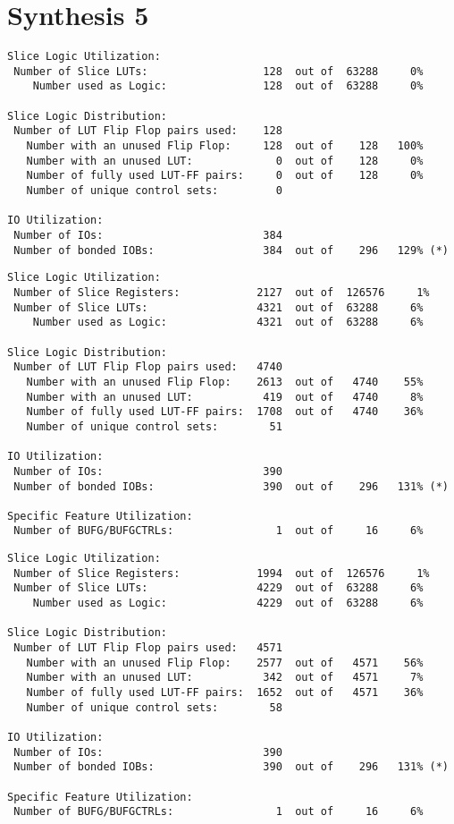 \section*{Synthesis 5}
\begin{verbatim}
Slice Logic Utilization: 
 Number of Slice LUTs:                  128  out of  63288     0%  
    Number used as Logic:               128  out of  63288     0%  

Slice Logic Distribution: 
 Number of LUT Flip Flop pairs used:    128
   Number with an unused Flip Flop:     128  out of    128   100%  
   Number with an unused LUT:             0  out of    128     0%  
   Number of fully used LUT-FF pairs:     0  out of    128     0%  
   Number of unique control sets:         0

IO Utilization: 
 Number of IOs:                         384
 Number of bonded IOBs:                 384  out of    296   129% (*) 
\end{verbatim}

\begin{verbatim}
Slice Logic Utilization: 
 Number of Slice Registers:            2127  out of  126576     1%  
 Number of Slice LUTs:                 4321  out of  63288     6%  
    Number used as Logic:              4321  out of  63288     6%  

Slice Logic Distribution: 
 Number of LUT Flip Flop pairs used:   4740
   Number with an unused Flip Flop:    2613  out of   4740    55%  
   Number with an unused LUT:           419  out of   4740     8%  
   Number of fully used LUT-FF pairs:  1708  out of   4740    36%  
   Number of unique control sets:        51

IO Utilization: 
 Number of IOs:                         390
 Number of bonded IOBs:                 390  out of    296   131% (*) 

Specific Feature Utilization:
 Number of BUFG/BUFGCTRLs:                1  out of     16     6%  
\end{verbatim}

\begin{verbatim}
Slice Logic Utilization: 
 Number of Slice Registers:            1994  out of  126576     1%  
 Number of Slice LUTs:                 4229  out of  63288     6%  
    Number used as Logic:              4229  out of  63288     6%  

Slice Logic Distribution: 
 Number of LUT Flip Flop pairs used:   4571
   Number with an unused Flip Flop:    2577  out of   4571    56%  
   Number with an unused LUT:           342  out of   4571     7%  
   Number of fully used LUT-FF pairs:  1652  out of   4571    36%  
   Number of unique control sets:        58

IO Utilization: 
 Number of IOs:                         390
 Number of bonded IOBs:                 390  out of    296   131% (*) 

Specific Feature Utilization:
 Number of BUFG/BUFGCTRLs:                1  out of     16     6%  
\end{verbatim}

